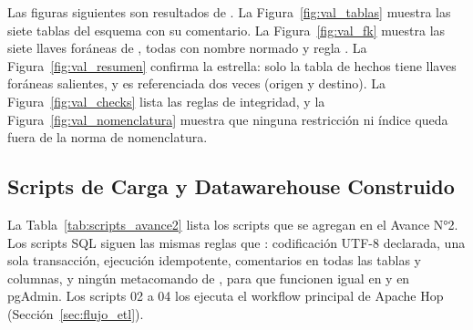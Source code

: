 Las figuras siguientes son resultados de . La
Figura~\ref{fig:val_tablas} muestra las siete tablas del esquema con su
comentario. La Figura~\ref{fig:val_fk} muestra las siete llaves foráneas de
, todas con nombre normado y regla . La
Figura~\ref{fig:val_resumen} confirma la estrella: solo la tabla de hechos
tiene llaves foráneas salientes, y  es referenciada dos veces
(origen y destino). La Figura~\ref{fig:val_checks} lista las reglas de
integridad, y la Figura~\ref{fig:val_nomenclatura} muestra que ninguna
restricción ni índice queda fuera de la norma de nomenclatura.


\subsection{Scripts de Carga y Datawarehouse Construido}
\label{sec:scripts_avance2}

La Tabla~\ref{tab:scripts_avance2} lista los scripts que se agregan en el
Avance N°2. Los scripts SQL siguen las mismas reglas que :
codificación UTF-8 declarada, una sola transacción, ejecución idempotente,
comentarios en todas las tablas y columnas, y ningún metacomando de ,
para que funcionen igual en  y en pgAdmin. Los scripts 02 a 04 los
ejecuta el workflow principal de Apache Hop
(Sección~\ref{sec:flujo_etl}).

